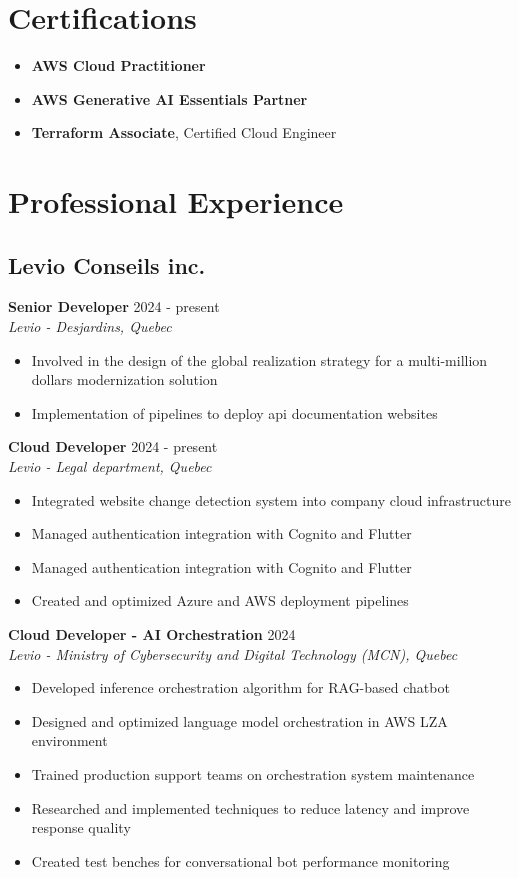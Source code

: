 ﻿\documentclass[11pt,letterpaper]{article}
\begin{document}
\section*{Certifications}
\begin{itemize}[leftmargin=1.5em]
  \item \textbf{AWS Cloud Practitioner}
  \item \textbf{AWS Generative AI Essentials Partner}
  \item \textbf{Terraform Associate}, Certified Cloud Engineer
\end{itemize}

\section*{Professional Experience}

\subsection*{Levio Conseils inc.}

\textbf{Senior Developer} \hfill 2024 - present\\
\textit{Levio - Desjardins, Quebec}
\begin{itemize}
\item Involved in the design of the global realization strategy for a multi-million dollars modernization solution
\item Implementation of pipelines to deploy api documentation websites
\end{itemize}

\textbf{Cloud Developer} \hfill 2024 - present\\
\textit{Levio - Legal department, Quebec}
\begin{itemize}
\item Integrated website change detection system into company cloud infrastructure
\item Managed authentication integration with Cognito and Flutter
\item Managed authentication integration with Cognito and Flutter
\item Created and optimized Azure and AWS deployment pipelines
\end{itemize}

\textbf{Cloud Developer - AI Orchestration} \hfill 2024\\
\textit{Levio - Ministry of Cybersecurity and Digital Technology (MCN), Quebec}
\begin{itemize}
\item Developed inference orchestration algorithm for RAG-based chatbot
\item Designed and optimized language model orchestration in AWS LZA environment
\item Trained production support teams on orchestration system maintenance
\item Researched and implemented techniques to reduce latency and improve response quality
\item Created test benches for conversational bot performance monitoring
\end{itemize}
\end{document}

